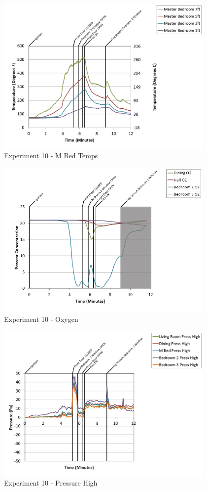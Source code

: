 \documentclass{article}
\begin{document}
\begin{appendices}
\begin{figure}[h!]
	\centering
	\includegraphics[height=3.05in]{0_Images/Results_Charts/Exp_10_Charts/MBedTemps.png}
	\caption{Experiment 10 - M Bed Temps}
\end{figure}

\clearpage

\begin{figure}[h!]
	\centering
	\includegraphics[height=3.05in]{0_Images/Results_Charts/Exp_10_Charts/Oxygen.png}
	\caption{Experiment 10 - Oxygen}
\end{figure}


\begin{figure}[h!]
	\centering
	\includegraphics[height=3.05in]{0_Images/Results_Charts/Exp_10_Charts/PressureHigh.png}
	\caption{Experiment 10 - Pressure High}
\end{figure}


\end{appendices}
\end{document}

